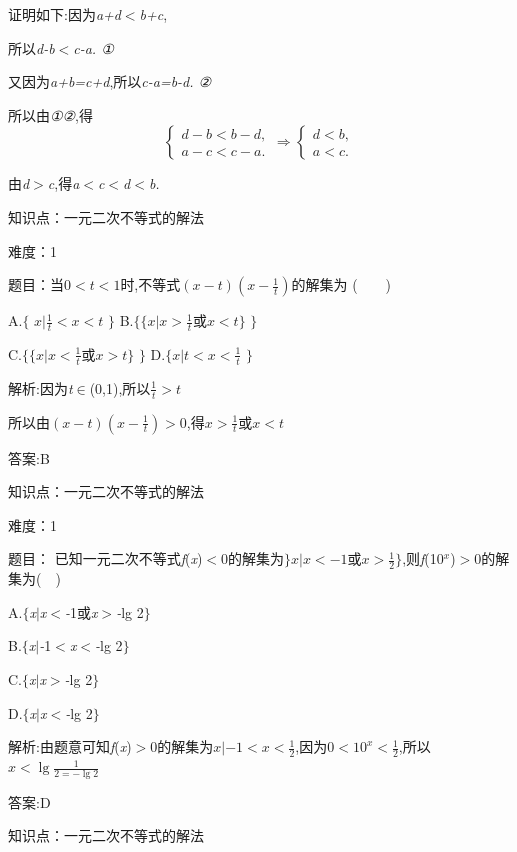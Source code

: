 \documentclass{article} %
\begin{document}
证明如下:因为\textit{a+d$<$b+c},

所以\textit{d-b$<$c-a. ①}

又因为\textit{a+b=c+d},所以\textit{c-a=b-d. ②}

所以由\textit{①②},得
\[
\begin{cases}
d-b<b-d,\\
a-c<c-a.
\end{cases}
\Rightarrow
\begin{cases}
d<b,\\
a<c.
\end{cases}
\]

由\textit{d$>$c},得\textit{a$<$c$<$d$<$b.}



知识点：一元二次不等式的解法

难度：1

 题目：当\textit{$0<t<1$}时,不等式$ (x-t)(x-\frac{1}{t})$的解集为 (\textit{　　})

 

 A.$\mathrm{\{}$ ${x|\frac{1}{t}<x<t}$ $\mathrm{\}}$ B.$\mathrm{\{}$$\lbrace x|x>\frac{1}{t}$或$x<t\rbrace$ $\mathrm{\}}$

 C.$\mathrm{\{}$$\lbrace x|x<\frac{1}{t}$或$x>t\rbrace$ $\mathrm{\}}$ D.$\mathrm{\{}$${x|t<x<\frac{1}{t}}$ $\mathrm{\}}$

 解析:因为\textit{t}$\mathrm{\in}$(0,1),所以$\frac{1}{t}>t$

所以由$(x-t)(x-\frac{1}{t})>0$,得$x>\frac{1}{t}$或$x<t$

 答案:B

知识点：一元二次不等式的解法

难度：1

 题目：
已知一元二次不等式\textit{f}(\textit{x})\textit{$<$}0的解集为$\mathrm{\}}$$x|x<-1$或$x>\frac{1}{2}$$\mathrm{\}}$,则\textit{f}(10\textit{${}^{x}$})\textit{$>$}0的解集为(\textit{　})

 A.$\mathrm{\{}$\textit{x$ |$x$<$-}1或\textit{x$>$-}lg 2$\mathrm{\}}$

 B.$\mathrm{\{}$\textit{x$ |$-}1\textit{$<$x$<$-}lg 2$\mathrm{\}}$

 C.$\mathrm{\{}$\textit{x$ |$x$>$-}lg 2$\mathrm{\}}$

 D.$\mathrm{\{}$\textit{x$ |$x$<$-}lg 2$\mathrm{\}}$

 解析:由题意可知\textit{f}(\textit{x})\textit{$>$}0的解集为${x|-1<x<\frac{1}{2}}$,因为$0<10^x<\frac{1}{2}$,所以$x<\lg\frac{1}{2=-\lg2}$

 答案:D

知识点：一元二次不等式的解法
\end{document}
